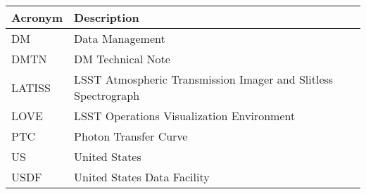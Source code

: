 \addtocounter{table}{-1}
\begin{longtable}{p{}p{}}\hline
\textbf{Acronym} & \textbf{Description}  \\\hline

DM & Data Management \\\hline
DMTN & DM Technical Note \\\hline
LATISS & LSST Atmospheric Transmission Imager and Slitless Spectrograph \\\hline
LOVE & LSST Operations Visualization Environment \\\hline
PTC & Photon Transfer Curve \\\hline
US & United States \\\hline
USDF & United States Data Facility \\\hline
\end{longtable}

